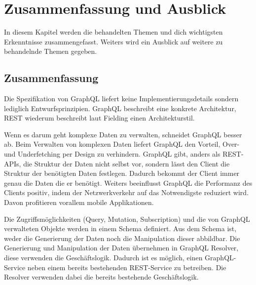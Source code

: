 \chapter{Zusammenfassung und Ausblick}
In diesem Kapitel werden die behandelten Themen und dich wichtigsten Erkenntnisse zusammengefasst.
Weiters wird ein Ausblick auf weitere zu behandelnde Themen gegeben.

\section{Zusammenfassung}
Die Spezifikation von GraphQL liefert keine Implementierungsdetails sondern lediglich Entwurfsprinzipien.
GraphQL beschreibt eine konkrete Architektur, REST wiederum beschreibt laut Fielding einen Architekturstil.
\newline

Wenn es darum geht komplexe Daten zu verwalten, schneidet GraphQL besser ab.
Beim Verwalten von komplexen Daten liefert GraphQL den Vorteil, Over- und Underfetching per Design zu verhindern.
GraphQL gibt, anders als REST-APIs, die Struktur der Daten nicht selbst vor, sondern lässt den Client die Struktur der benötigten Daten festlegen. 
Dadurch bekommt der Client immer genau die Daten die er benötigt.
Weiters beeinflusst GraphQL die Performanz des Clients positiv, indem der Netzwerkverkehr auf das Notwendigste reduziert wird.
Davon profitieren vorallem mobile Applikationen.
\newline

Die Zugriffsmöglichkeiten (Query, Mutation, Subscription) und die von GraphQL verwalteten Objekte werden in einem Schema definiert.
Aus dem Schema ist, weder die Generierung der Daten noch die Manipulation dieser abbildbar.
Die Generierung und Manipulation der Daten übernehmen in GraphQL Resolver, diese verwenden die Geschäftslogik.
Dadurch ist es möglich, einen GraphQL-Service neben einem bereits bestehenden REST-Service zu betreiben.
Die Resolver verwenden dabei die bereits bestehende Geschäftslogik.
\newline

